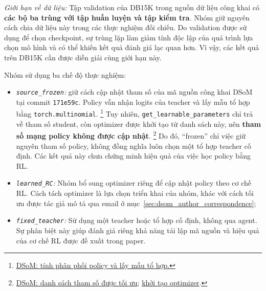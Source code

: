 \begin{samepage}
\noindent\textit{Giới hạn về dữ liệu:} Tập validation của DB15K trong nguồn dữ liệu công khai có \textbf{các bộ ba trùng với tập huấn luyện và tập kiểm tra}. Nhóm giữ nguyên cách chia dữ liệu này trong các thực nghiệm đối chiếu. Do validation được sử dụng để chọn checkpoint, sự trùng lặp làm giảm tính độc lập của quá trình lựa chọn mô hình và có thể khiến kết quả đánh giá lạc quan hơn. Vì vậy, các kết quả trên DB15K cần được diễn giải cùng giới hạn này.
\par
\end{samepage}

Nhóm sử dụng ba chế độ thực nghiệm:

\begin{itemize}
    \item \textit{\texttt{source\_frozen}:} giữ cách cập nhật tham số của mã nguồn
        công khai DSoM tại commit \texttt{171e59c}. Policy vẫn nhận
        logits của teacher và lấy mẫu tổ hợp bằng
        \texttt{torch.multinomial}.
        \footnote{\href{https://github.com/OreOZhao/DSoM/blob/171e59cb069d50abf039fa824b079e23b8956696/src/kd.py\#L337-L354}{DSoM: tính phân phối policy và lấy mẫu tổ hợp.}}
        Tuy nhiên, \texttt{get\_learnable\_parameters} chỉ trả về tham
        số student, còn optimizer được khởi tạo từ danh sách này,
        nên \textbf{tham số mạng policy không được cập nhật}.
        \footnote{\href{https://github.com/OreOZhao/DSoM/blob/171e59cb069d50abf039fa824b079e23b8956696/src/kd.py\#L22-L24}{DSoM: danh sách tham số được tối ưu};
        \href{https://github.com/OreOZhao/DSoM/blob/171e59cb069d50abf039fa824b079e23b8956696/src/kd_learn.py\#L246-L255}{khởi tạo optimizer}.}
        Do đó, ``frozen'' chỉ việc giữ nguyên tham số policy, không
        đồng nghĩa luôn chọn một tổ hợp teacher cố định. Các kết quả
        này chưa chứng minh hiệu quả của việc học policy bằng RL.
    \item \textit{\texttt{learned\_RC}:} Nhóm bổ sung optimizer
        riêng để cập nhật policy theo cơ chế RL. Cách tách
        optimizer là lựa chọn triển khai của nhóm, khác với
        cách tối ưu được tác giả mô tả qua email ở
        mục~\ref{sec:dsom_author_correspondence};
    \item \textit{\texttt{fixed\_teacher}:} Sử dụng một teacher hoặc tổ hợp cố định, không qua agent. Sự phân biệt này giúp đánh giá riêng khả năng tái lập mã nguồn và hiệu quả của cơ chế RL được đề xuất trong paper.
\end{itemize}

